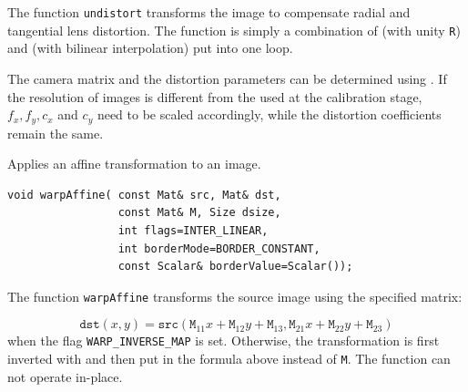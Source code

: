 The function \texttt{undistort} transforms the image to compensate
radial and tangential lens distortion. The function is simply a combination of  (with unity \texttt{R}) and  (with bilinear interpolation) put into one loop.

The camera matrix and the distortion parameters can be determined using
. If the resolution of images is different from the used at the calibration stage, $f_x, f_y, c_x$ and $c_y$
need to be scaled accordingly, while the distortion coefficients remain the same.

\label{warpAffine}
Applies an affine transformation to an image.

\begin{lstlisting}
void warpAffine( const Mat& src, Mat& dst,
                 const Mat& M, Size dsize,
                 int flags=INTER_LINEAR,
                 int borderMode=BORDER_CONSTANT,
                 const Scalar& borderValue=Scalar());
\end{lstlisting}
\begin{description}
\end{description}

The function \texttt{warpAffine} transforms the source image using the specified matrix:

\[
\texttt{dst}(x,y) = \texttt{src}(\texttt{M}_{11} x + \texttt{M}_{12} y + \texttt{M}_{13}, \texttt{M}_{21} x + \texttt{M}_{22} y + \texttt{M}_{23})
\]
when the flag \texttt{WARP\_INVERSE\_MAP} is set. Otherwise, the transformation is first inverted with  and then put in the formula above instead of \texttt{M}.
The function can not operate in-place.

